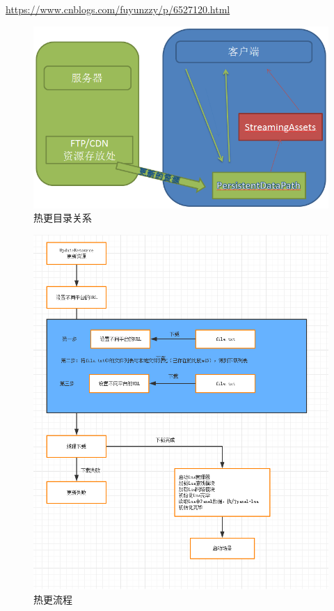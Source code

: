 \documentclass[UTF8,a4paper,12pt]{ctexbook}
\begin{document}
		
			\url{https://www.cnblogs.com/fuyunzzy/p/6527120.html}
		
			\begin{figure}[H]
				\centering
				\includegraphics[scale=0.45]{AbUpdate}
				\caption{热更目录关系}
			\end{figure}
			
			\begin{figure}[H]
				\centering
				\includegraphics[scale=0.5]{AbUpdateProcess}
				\caption{热更流程}
			\end{figure}			
			
\end{document}
